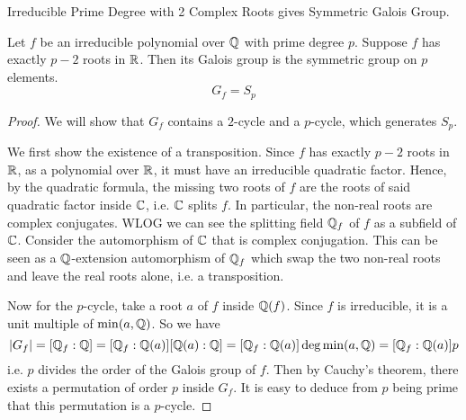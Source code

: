 \documentclass[../book.tex]{subfiles}
\begin{document}
\begin{thm} Irreducible Prime Degree with 2 Complex Roots 
gives Symmetric Galois Group. 
    
    Let $f$ be an irreducible polynomial over $\mathbb{Q}$ with prime degree $p$.
    Suppose $f$ has exactly $p-2$ roots in $\mathbb{R}$. 
    Then its Galois group is the symmetric group on $p$ elements. 
    \[ G_f = S_p \]
    
\end{thm}
\begin{proof}
    
    We will show that $G_f$ contains a $2$-cycle and a $p$-cycle,
    which generates $S_p$. 
    
    We first show the existence of a transposition. 
    Since $f$ has exactly $p-2$ roots in $\mathbb{R}$, 
    as a polynomial over $\mathbb{R}$, it must have an irreducible quadratic factor. 
    Hence, by the quadratic formula, 
    the missing two roots of $f$ are the roots of said quadratic factor inside $\mathbb{C}$,
    i.e. $\mathbb{C}$ splits $f$. 
    In particular, the non-real roots are complex conjugates. 
    WLOG we can see the splitting field $\mathbb{Q}_f$ of $f$ as a subfield of $\mathbb{C}$.
    Consider the automorphism of $\mathbb{C}$ that is complex conjugation. 
    This can be seen as a $\mathbb{Q}$-extension automorphism of $\mathbb{Q}_f$
    which swap the two non-real roots and leave the real roots alone, 
    i.e. a transposition. 
    
    Now for the $p$-cycle, take a root $a$ of $f$ inside $\mathbb{Q}(f)$.
    Since $f$ is irreducible, it is a unit multiple of $\min(a,\mathbb{Q})$. 
    So we have \[
        |G_f| = [\mathbb{Q}_f : \mathbb{Q}] = [\mathbb{Q}_f : \mathbb{Q}(a)] [\mathbb{Q}(a) : \mathbb{Q}]
        = [\mathbb{Q}_f : \mathbb{Q}(a)] \deg \min(a,\mathbb{Q}) = [\mathbb{Q}_f : \mathbb{Q}(a)] p 
    \]
    i.e. $p$ divides the order of the Galois group of $f$. 
    Then by Cauchy's theorem, there exists a permutation of order $p$ inside $G_f$. 
    It is easy to deduce from $p$ being prime that this permutation is a $p$-cycle. 
    
\end{proof}
\end{document}
